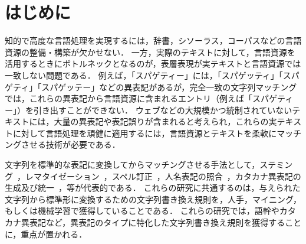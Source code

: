 \documentclass[japanese]{jnlp_JS2.0}
\begin{document}
\maketitle

\section{はじめに}

知的で高度な言語処理を実現するには，辞書，シソーラス，コーパスなどの言語資源の整備・構築が欠かせない．
一方，実際のテキストに対して，言語資源を活用するときにボトルネックとなるのが，表層表現が実テキストと言語資源では一致しない問題である．
例えば，「スパゲティー」には，「スパゲッティ」「スパゲティ」「スパゲッテー」などの異表記があるが，完全一致の文字列マッチングでは，これらの異表記から言語資源に含まれるエントリ（例えば「スパゲティー」）を引き出すことができない．
ウェブなどの大規模かつ統制されていないテキストには，大量の異表記や表記誤りが含まれると考えられ，これらの実テキストに対して言語処理を頑健に適用するには，言語資源とテキストを柔軟にマッチングさせる技術が必要である．

文字列を標準的な表記に変換してからマッチングさせる手法として，ステミング~\cite{Porter:80}，レマタイゼーション~\cite{Okazaki:08,Jongejan:09}，スペル訂正~\cite{Brill:00,Ahmad:05,Li:06,Chen:07}，人名表記の照合~\cite{Takahashi:95}，カタカナ異表記の生成及び統一~\cite{獅々堀:94}，等が代表的である．
これらの研究に共通するのは，与えられた文字列から標準形に変換するための文字列書き換え規則を，人手，マイニング，もしくは機械学習で獲得していることである．
これらの研究では，語幹やカタカナ異表記など，異表記のタイプに特化した文字列書き換え規則を獲得することに，重点が置かれる．
\end{document}
